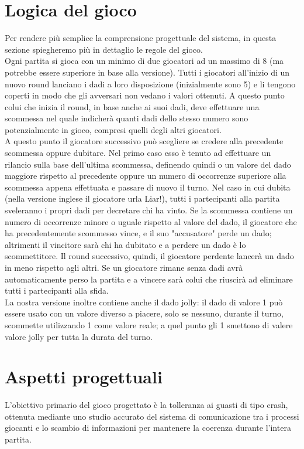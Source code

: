 \documentclass{llncs}
\begin{document}
	\section{Logica del gioco}
		Per rendere più semplice la comprensione progettuale del sistema, in questa sezione spiegheremo più in dettaglio le regole del gioco. \\
		Ogni partita si gioca con un minimo di due giocatori ad un massimo di 8 (ma potrebbe essere superiore in base alla versione). Tutti i giocatori all'inizio di un nuovo round lanciano i dadi a loro disposizione (inizialmente sono 5) e li tengono coperti in modo che gli avversari non vedano i valori ottenuti. A questo punto colui che inizia il round, in base anche ai suoi dadi, deve effettuare una scommessa nel quale indicherà quanti dadi dello stesso numero sono potenzialmente in gioco, compresi quelli degli altri giocatori.\\ A questo punto il giocatore successivo può scegliere se credere alla precedente scommessa oppure dubitare. Nel primo caso esso è tenuto ad effettuare un rilancio sulla base dell'ultima scommessa, definendo quindi o un valore del dado maggiore rispetto al precedente oppure un numero di occorrenze superiore alla scommessa appena effettuata e passare di nuovo il turno. Nel caso in cui dubita (nella versione inglese il giocatore urla Liar!), tutti i partecipanti alla partita sveleranno i propri dadi per decretare chi ha vinto. Se la scommessa contiene un numero di occorrenze minore o uguale rispetto al valore del dado, il giocatore che ha precedentemente scommesso vince, e il suo "accusatore" perde un dado; altrimenti il vincitore sarà chi ha dubitato e a perdere un dado è lo scommettitore. Il round successivo, quindi, il giocatore perdente lancerà un dado in meno rispetto agli altri. Se un giocatore rimane senza dadi avrà automaticamente perso la partita e a vincere sarà colui che riuscirà ad eliminare tutti i partecipanti alla sfida.\\
		La nostra versione inoltre contiene anche il dado jolly: il dado di valore 1 può essere usato con un valore diverso a piacere, solo se nessuno, durante il turno, scommette utilizzando 1 come valore reale; a quel punto gli 1 smettono di valere valore jolly per tutta la durata del turno.
	
\section{Aspetti progettuali}
L'obiettivo primario del gioco progettato è la tolleranza ai guasti di tipo crash, ottenuta mediante uno studio accurato del sistema di comunicazione tra i processi giocanti e lo scambio di informazioni per mantenere la coerenza durante l'intera partita.
\end{document}
